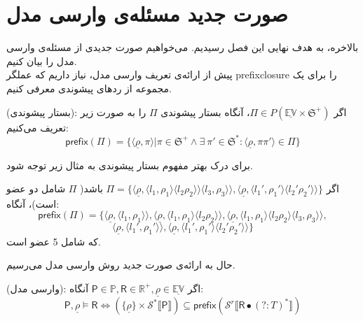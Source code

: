 \section{صورت جدید مسئله‌ی وارسی مدل}
بالاخره، به هدف نهایی این فصل رسیدیم. می‌خواهیم صورت جدیدی از مسئله‌ی وارسی مدل را بیان ‌کنیم.\\
پیش از ارائه‌ی تعریف وارسی مدل، نیاز داریم که عملگر \gls{prefixclosure} را برای یک مجموعه از ردهای پیشوندی معرفی کنیم.
\begin{defn}
	(بستار پیشوندی):
	اگر 
	$\Pi \in \mathit{P}(\mathbb{\underline{EV}\times \mathfrak{S}^+})$،
	آنگاه بستار پیشوندی $\Pi$ را به صورت زیر تعریف می‌کنیم:
	$$\mathsf{prefix}(\Pi)=
	\{\langle \underline{\rho},\pi\rangle | \pi \in \mathfrak{S^+} \land \exists\
	\pi' \in \mathfrak{S^*}: \langle \underline{\rho}, \pi \pi' \rangle \in \Pi \}$$
\end{defn}

برای درک بهتر مفهوم بستار پیشوندی به مثال زیر توجه شود.
\begin{exm}
	اگر 
	$\Pi = \{\langle\underline{\rho},\langle l_1 , \rho_1 \rangle 
	\langle l_2  \rho_2 \rangle\rangle  \langle l_3 , \rho_3 \rangle\rangle 
	,
	\langle\underline{\rho},\langle {l_1}' , {\rho_1}' \rangle  \langle {l_2}'  {\rho_2}' \rangle\rangle
	\}$
	باشد( $\Pi$ شامل دو عضو است)، آنگاه:
	$$
	\mathsf{prefix}(\Pi)=
	\{
	\langle\underline{\rho},\langle l_1 , \rho_1 \rangle\rangle ,
	\langle\underline{\rho},\langle l_1 , \rho_1 \rangle  \langle l_2  \rho_2 \rangle\rangle,
	\langle\underline{\rho},\langle l_1 , \rho_1 \rangle  \langle l_2  \rho_2 \rangle  \langle l_3 , \rho_3 \rangle\rangle ,$$
	$$
	\langle\underline{\rho},\langle {l_1}' , {\rho_1}' \rangle\rangle,
	\langle\underline{\rho},\langle {l_1}' , {\rho_1}' \rangle  \langle {l_2}'  {\rho_2}' \rangle\rangle
	\}
	$$
	که شامل 5 عضو است.
\end{exm}
حال به ارائه‌ی صورت جدید روش وارسی مدل می‌رسیم.
\begin{defn}
(وارسی مدل):
	اگر 
	$\mathsf{P}\in\mathbb{P} , \mathsf{R} \in \mathbb{R}^+ , \underline{\rho} \in \underline{\mathbb{EV}}$
	آنگاه:
	$$\mathsf{P},\underline{\rho} \models \mathsf{R}
	 \Leftrightarrow
	(\{\underline{\rho}\}\times \mathcal{S}^* \llbracket\mathsf{P}\rrbracket) \subseteq 
	\mathsf{prefix} (\mathcal{S}^r \llbracket\mathsf{R} \bullet (?:\mathit{T})^*\rrbracket)
	$$
\end{defn}

